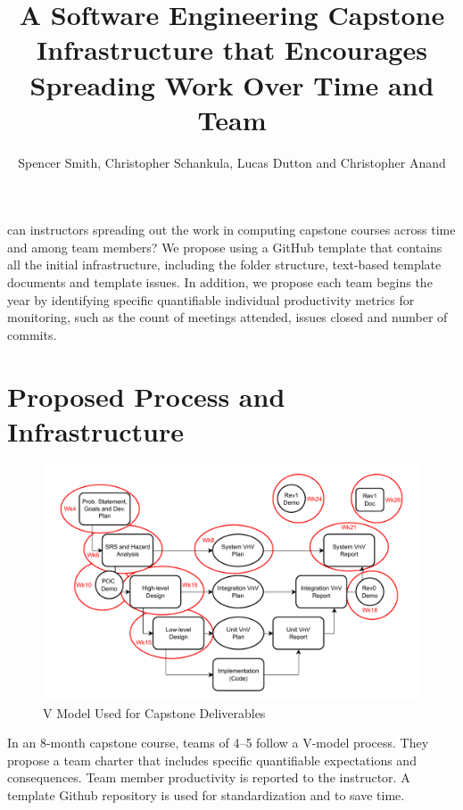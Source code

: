 \documentclass[poster, a1, plainboxedsections]{sciposter}
\title{A Software Engineering Capstone Infrastructure that Encourages Spreading
Work Over Time and Team}
\author{Spencer Smith, Christopher Schankula, Lucas Dutton and Christopher Anand}
\institute{Computing and Software Department, McMaster University}
\begin{document}

\maketitle

\setlength{\columnseprule}{0pt}
\begin{multicols}{2}

 can instructors spreading out the work in computing capstone
courses across time and among team members? We propose using a GitHub template
that contains all the initial infrastructure, including the folder
structure, text-based template documents and template issues. In addition, we
propose each team begins the year by identifying specific quantifiable
individual productivity metrics for monitoring, such as the count of meetings
attended, issues closed and number of commits.

\section{Proposed Process and Infrastructure} \label{SecPropInfrastruc}

\begin{figure}[!h]
\includegraphics[width=1.0\linewidth]{../figures/CourseStructure.drawio.pdf}
\caption{\label{Fig_VModel} V Model Used for Capstone Deliverables}
\label{FigStructure}
\end{figure}

In an 8-month capstone course, teams of 4--5 follow a V-model process. They
propose a team charter that includes specific quantifiable expectations and
consequences. Team member productivity is reported to the instructor. A template
Github repository is used for standardization and to save time.  


\end{multicols}
\end{document}
